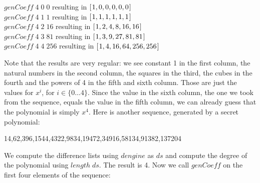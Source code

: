 \documentclass[tikz]{scrreprt}
\newcommand{\Varid}[1]{\mathit{#1}}
\begin{document}
\begin{minipage}{\textwidth}
\ensuremath{\Varid{genCoeff}\;\mathrm{4}\;\mathrm{0}\;\mathrm{0}} resulting in \ensuremath{[\mskip1.5mu \mathrm{1},\mathrm{0},\mathrm{0},\mathrm{0},\mathrm{0},\mathrm{0}\mskip1.5mu]}\\
\ensuremath{\Varid{genCoeff}\;\mathrm{4}\;\mathrm{1}\;\mathrm{1}} resulting in \ensuremath{[\mskip1.5mu \mathrm{1},\mathrm{1},\mathrm{1},\mathrm{1},\mathrm{1},\mathrm{1}\mskip1.5mu]}\\
\ensuremath{\Varid{genCoeff}\;\mathrm{4}\;\mathrm{2}\;\mathrm{16}} resulting in \ensuremath{[\mskip1.5mu \mathrm{1},\mathrm{2},\mathrm{4},\mathrm{8},\mathrm{16},\mathrm{16}\mskip1.5mu]}\\
\ensuremath{\Varid{genCoeff}\;\mathrm{4}\;\mathrm{3}\;\mathrm{81}} resulting in \ensuremath{[\mskip1.5mu \mathrm{1},\mathrm{3},\mathrm{9},\mathrm{27},\mathrm{81},\mathrm{81}\mskip1.5mu]}\\
\ensuremath{\Varid{genCoeff}\;\mathrm{4}\;\mathrm{4}\;\mathrm{256}} resulting in \ensuremath{[\mskip1.5mu \mathrm{1},\mathrm{4},\mathrm{16},\mathrm{64},\mathrm{256},\mathrm{256}\mskip1.5mu]}
\end{minipage}

Note that the results are very regular:
we see constant 1 in the first column,
the natural numbers in the second column,
the squares in the third, the cubes in the fourth and
the powers of 4 in the fifth and sixth column.
Those are just the values for $x^i$, 
for $i \in \lbrace 0\dots 4\rbrace$.
Since the value in the sixth column, the one we took
from the sequence, equals the value in the fifth column,
we can already guess that the polynomial is simply $x^4$.
Here is another sequence, generated by a secret polynomial:

14,62,396,1544,4322,9834,19472,34916,58134,91382,137204

We compute the difference lists using 
\ensuremath{\Varid{dengine}} as \ensuremath{\Varid{ds}} and compute the degree of the polynomial
using \ensuremath{\Varid{length}\;\Varid{ds}}. The result is 4.
Now we call \ensuremath{\Varid{genCoeff}} on the first four elements of the sequence:
\end{document}
